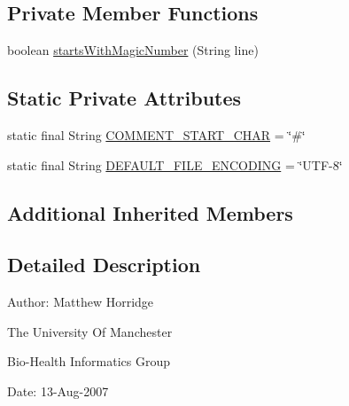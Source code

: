 \subsection*{Private Member Functions}
\begin{DoxyCompactItemize}
\item 
boolean \hyperlink{classorg_1_1coode_1_1owlapi_1_1manchesterowlsyntax_1_1_manchester_o_w_l_syntax_ontology_parser_a36533f44d2cb38e6ff60abf4cf772972}{starts\-With\-Magic\-Number} (String line)
\end{DoxyCompactItemize}
\subsection*{Static Private Attributes}
\begin{DoxyCompactItemize}
\item 
static final String \hyperlink{classorg_1_1coode_1_1owlapi_1_1manchesterowlsyntax_1_1_manchester_o_w_l_syntax_ontology_parser_ae90c47c76f4ac442077a936bcd227eff}{C\-O\-M\-M\-E\-N\-T\-\_\-\-S\-T\-A\-R\-T\-\_\-\-C\-H\-A\-R} = \char`\"{}\#\char`\"{}
\item 
static final String \hyperlink{classorg_1_1coode_1_1owlapi_1_1manchesterowlsyntax_1_1_manchester_o_w_l_syntax_ontology_parser_a3e92316656f342d0d664d43aeca776b9}{D\-E\-F\-A\-U\-L\-T\-\_\-\-F\-I\-L\-E\-\_\-\-E\-N\-C\-O\-D\-I\-N\-G} = \char`\"{}U\-T\-F-\/8\char`\"{}
\end{DoxyCompactItemize}
\subsection*{Additional Inherited Members}


\subsection{Detailed Description}
Author\-: Matthew Horridge\par
 The University Of Manchester\par
 Bio-\/\-Health Informatics Group\par
 Date\-: 13-\/\-Aug-\/2007\par
\par
 

